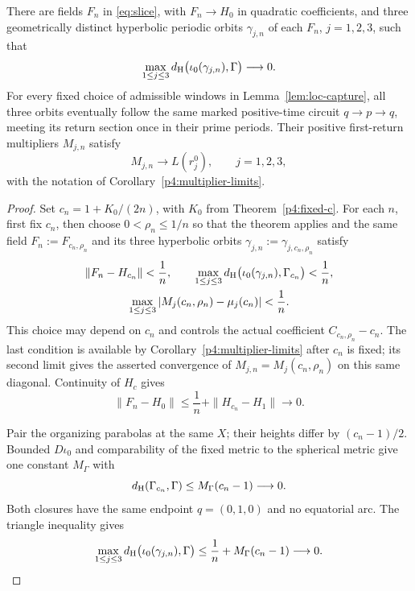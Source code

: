 \begin{lemma}\label{rew:lem-endpoint-attainment}
There are fields \(F_n\) in \eqref{eq:slice}, with
\(F_n\to H_0\) in quadratic coefficients, and three geometrically
distinct hyperbolic periodic orbits \(\gamma_{j,n}\) of each
\(F_n\), \(j=1,2,3\), such that
\[
 \max_{1\le j\le3}
 d_{\rm H}\bigl(\iota_0(\gamma_{j,n}),\Gamma\bigr)\longrightarrow0.
\]
For every fixed choice of admissible windows in
Lemma~\ref{lem:loc-capture}, all three orbits eventually follow the
same marked positive-time circuit \(q\to p\to q\), meeting its
return section once in their prime periods.
Their positive first-return multipliers $M_{j,n}$ satisfy
\[
 M_{j,n}\longrightarrow L(r_j^0),\qquad j=1,2,3,
\]
with the notation of Corollary~\ref{p4:multiplier-limits}.
\end{lemma}
\begin{proof}
Set \(c_n=1+K_0/(2n)\), with \(K_0\) from
Theorem~\ref{p4:fixed-c}. For each \(n\), first fix \(c_n\), then
choose \(0<\rho_n\le1/n\) so that the theorem applies and the same field
\(F_n:=F_{c_n,\rho_n}\) and its three hyperbolic orbits
\(\gamma_{j,n}:=\gamma_{j,c_n,\rho_n}\) satisfy
\begin{equation}\label{rew:eq-endpoint-diagonal-selection}
 \begin{gathered}
 \|F_n-H_{c_n}\|<\frac1n,\qquad
 \max_{1\le j\le3}
 d_{\rm H}\bigl(\iota_0(\gamma_{j,n}),\Gamma_{c_n}\bigr)<\frac1n,\\
 \max_{1\le j\le3}
 |M_j(c_n,\rho_n)-\mu_j(c_n)|<\frac1n.
 \end{gathered}
\end{equation}
This choice may depend on \(c_n\) and controls the actual coefficient
\(C_{c_n,\rho_n}-c_n\). The last condition is available by
Corollary~\ref{p4:multiplier-limits} after \(c_n\) is fixed; its
second limit gives the asserted convergence of
$M_{j,n}=M_j(c_n,\rho_n)$ on this same diagonal.
Continuity of \(H_c\) gives
\begin{equation}\label{rew:eq-endpoint-coefficients}
 \|F_n-H_0\|\le\frac1n+\|H_{c_n}-H_1\|\longrightarrow0.
\end{equation}

Pair the organizing parabolas at the same \(X\); their heights differ
by \((c_n-1)/2\). Bounded \(D\iota_0\) and comparability of the fixed
metric to the spherical metric give one constant \(M_\Gamma\) with
\begin{equation}\label{rew:eq-endpoint-graphics}
 d_{\rm H}(\Gamma_{c_n},\Gamma)\le M_\Gamma(c_n-1)
 \longrightarrow0.
\end{equation}
Both closures have the same endpoint \(q=(0,1,0)\) and no equatorial
arc. The triangle inequality gives
\begin{equation}\label{rew:eq-endpoint-cycles}
 \max_{1\le j\le3}
 d_{\rm H}\bigl(\iota_0(\gamma_{j,n}),\Gamma\bigr)
 \le\frac1n+M_\Gamma(c_n-1)\longrightarrow0.
\end{equation}


\end{proof}
